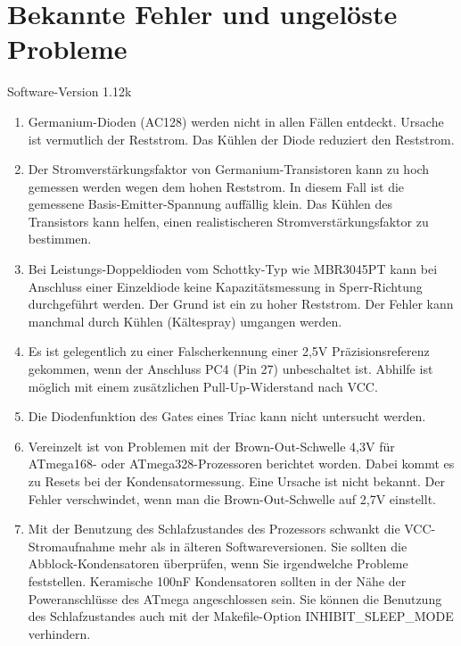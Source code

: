 
\chapter{Bekannte Fehler und ungelöste Probleme}
{\center Software-Version 1.12k}

\begin{enumerate}

\item Germanium-Dioden (AC128) werden nicht in allen Fällen entdeckt. Ursache ist vermutlich der Reststrom.
Das Kühlen der Diode reduziert den Reststrom.

\item Der Stromverstärkungsfaktor von Germanium-Transistoren kann zu hoch gemessen werden wegen dem hohen Reststrom.
In diesem Fall ist die gemessene Basis-Emitter-Spannung auffällig klein.
Das Kühlen des Transistors kann helfen, einen realistischeren Stromverstärkungsfaktor zu bestimmen.

\item Bei Leistungs-Doppeldioden vom Schottky-Typ wie MBR3045PT kann bei Anschluss einer Einzeldiode keine Kapazitätsmessung in Sperr-Richtung 
durchgeführt werden. Der Grund ist ein zu hoher Reststrom. Der Fehler kann manchmal durch Kühlen (Kältespray) umgangen werden.

\item Es ist gelegentlich zu einer Falscherkennung einer 2,5V Präzisionsreferenz gekommen, wenn der Anschluss PC4 (Pin 27) unbeschaltet ist.
Abhilfe ist möglich mit einem zusätzlichen Pull-Up-Widerstand nach VCC.

\item Die Diodenfunktion des Gates eines Triac kann nicht untersucht werden.

\item Vereinzelt ist von Problemen mit der Brown-Out-Schwelle 4,3V für ATmega168- oder ATmega328-Prozessoren berichtet worden.
Dabei kommt es zu Resets bei der Kondensatormessung. Eine Ursache ist nicht bekannt.
Der Fehler verschwindet, wenn man die Brown-Out-Schwelle auf 2,7V einstellt.

\item Mit der Benutzung des Schlafzustandes des Prozessors schwankt die VCC-Stromaufnahme mehr als
in älteren Softwareversionen.
Sie sollten die Abblock-Kondensatoren überprüfen, wenn Sie irgendwelche Probleme feststellen.
Keramische 100nF Kondensatoren sollten in der Nähe der Poweranschlüsse des ATmega angeschlossen sein.
Sie können die Benutzung des Schlafzustandes auch mit der Makefile-Option INHIBIT\_SLEEP\_MODE verhindern.


\end{enumerate}
